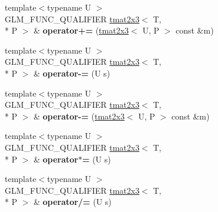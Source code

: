 \begin{DoxyCompactItemize}
\item 
\hypertarget{structglm_1_1detail_1_1tmat2x3_a5e17d74534e51b89fc4ef088fa42c867}{{\footnotesize template$<$typename U $>$ }\\G\-L\-M\-\_\-\-F\-U\-N\-C\-\_\-\-Q\-U\-A\-L\-I\-F\-I\-E\-R \hyperlink{structglm_1_1detail_1_1tmat2x3}{tmat2x3}$<$ T, \\*
P $>$ \& {\bfseries operator+=} (\hyperlink{structglm_1_1detail_1_1tmat2x3}{tmat2x3}$<$ U, P $>$ const \&m)}\label{structglm_1_1detail_1_1tmat2x3_a5e17d74534e51b89fc4ef088fa42c867}

\item 
\hypertarget{structglm_1_1detail_1_1tmat2x3_a9390f2064f9bdea63dc4e796822a42d4}{{\footnotesize template$<$typename U $>$ }\\G\-L\-M\-\_\-\-F\-U\-N\-C\-\_\-\-Q\-U\-A\-L\-I\-F\-I\-E\-R \hyperlink{structglm_1_1detail_1_1tmat2x3}{tmat2x3}$<$ T, \\*
P $>$ \& {\bfseries operator-\/=} (U s)}\label{structglm_1_1detail_1_1tmat2x3_a9390f2064f9bdea63dc4e796822a42d4}

\item 
\hypertarget{structglm_1_1detail_1_1tmat2x3_af1abd73945e5346e7ae1e5a953979aff}{{\footnotesize template$<$typename U $>$ }\\G\-L\-M\-\_\-\-F\-U\-N\-C\-\_\-\-Q\-U\-A\-L\-I\-F\-I\-E\-R \hyperlink{structglm_1_1detail_1_1tmat2x3}{tmat2x3}$<$ T, \\*
P $>$ \& {\bfseries operator-\/=} (\hyperlink{structglm_1_1detail_1_1tmat2x3}{tmat2x3}$<$ U, P $>$ const \&m)}\label{structglm_1_1detail_1_1tmat2x3_af1abd73945e5346e7ae1e5a953979aff}

\item 
\hypertarget{structglm_1_1detail_1_1tmat2x3_acb4473b53bf98d8330710d21fcfd9413}{{\footnotesize template$<$typename U $>$ }\\G\-L\-M\-\_\-\-F\-U\-N\-C\-\_\-\-Q\-U\-A\-L\-I\-F\-I\-E\-R \hyperlink{structglm_1_1detail_1_1tmat2x3}{tmat2x3}$<$ T, \\*
P $>$ \& {\bfseries operator$\ast$=} (U s)}\label{structglm_1_1detail_1_1tmat2x3_acb4473b53bf98d8330710d21fcfd9413}

\item 
\hypertarget{structglm_1_1detail_1_1tmat2x3_a98a33b4a96b4e55c24aee023e382eedd}{{\footnotesize template$<$typename U $>$ }\\G\-L\-M\-\_\-\-F\-U\-N\-C\-\_\-\-Q\-U\-A\-L\-I\-F\-I\-E\-R \hyperlink{structglm_1_1detail_1_1tmat2x3}{tmat2x3}$<$ T, \\*
P $>$ \& {\bfseries operator/=} (U s)}\label{structglm_1_1detail_1_1tmat2x3_a98a33b4a96b4e55c24aee023e382eedd}

\end{DoxyCompactItemize}


